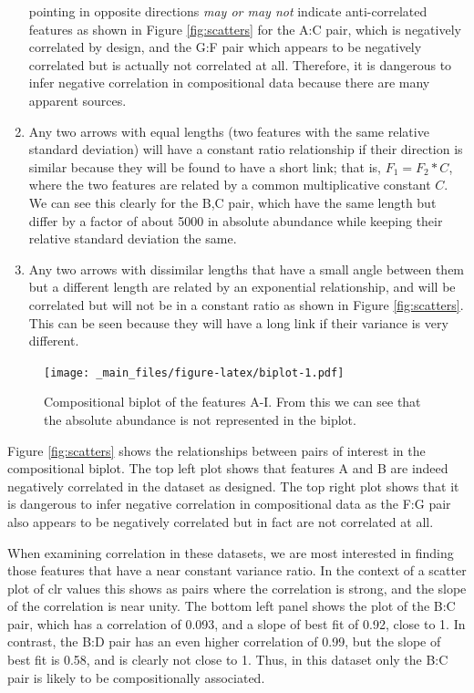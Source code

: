 \documentclass[onecolumn]{book}
\theoremstyle{definition}
\theoremstyle{definition}
\theoremstyle{definition}
\theoremstyle{remark}
\begin{document}
\begin{enumerate}
  pointing in opposite directions \emph{may or may not} indicate
  anti-correlated features as shown in Figure \ref{fig:scatters} for the
  A:C pair, which is negatively correlated by design, and the G:F pair
  which appears to be negatively correlated but is actually not
  correlated at all. Therefore, it is dangerous to infer negative
  correlation in compositional data because there are many apparent
  sources.
\item
  Any two arrows with equal lengths (two features with the same relative
  standard deviation) will have a constant ratio relationship if their
  direction is similar because they will be found to have a short link;
  that is, \(F_1 = F_2 * C\), where the two features are related by a
  common multiplicative constant \(C\). We can see this clearly for the
  B,C pair, which have the same length but differ by a factor of about
  5000 in absolute abundance while keeping their relative standard
  deviation the same.
\item
  Any two arrows with dissimilar lengths that have a small angle between
  them but a different length are related by an exponential
  relationship, and will be correlated but will not be in a constant
  ratio as shown in Figure \ref{fig:scatters}. This can be seen because
  they will have a long link if their variance is very different.
\end{enumerate}

\begin{figure}
\centering
\texttt{[image: \_main\_files/figure-latex/biplot-1.pdf]}
\caption{\label{fig:biplot}Compositional biplot of the features A-I. From
this we can see that the absolute abundance is not represented in the
biplot.}
\end{figure}

Figure \ref{fig:scatters} shows the relationships between pairs of
interest in the compositional biplot. The top left plot shows that
features A and B are indeed negatively correlated in the dataset as
designed. The top right plot shows that it is dangerous to infer
negative correlation in compositional data as the F:G pair also appears
to be negatively correlated but in fact are not correlated at all.

When examining correlation in these datasets, we are most interested in
finding those features that have a near constant variance ratio. In the
context of a scatter plot of clr values this shows as pairs where the
correlation is strong, and the slope of the correlation is near unity.
The bottom left panel shows the plot of the B:C pair, which has a
correlation of 0.093, and a slope of best fit of 0.92, close to 1. In
contrast, the B:D pair has an even higher correlation of 0.99, but the
slope of best fit is 0.58, and is clearly not close to 1. Thus, in this
dataset only the B:C pair is likely to be compositionally associated.
\end{document}
